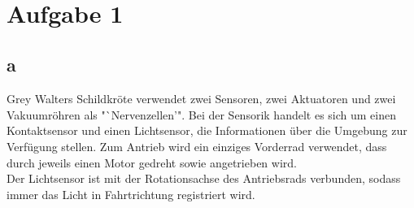 \documentclass{./Vorlage/mat}
\begin{document}
 \\

\section*{Aufgabe 1}
\subsection*{a}
Grey Walters Schildkröte verwendet zwei Sensoren, zwei Aktuatoren und zwei Vakuumröhren als "`Nervenzellen'". Bei der Sensorik handelt es sich um einen Kontaktsensor und einen Lichtsensor, die Informationen über die Umgebung zur Verfügung stellen. Zum Antrieb wird ein einziges Vorderrad verwendet, dass durch jeweils einen Motor gedreht sowie angetrieben wird.\\
Der Lichtsensor ist mit der Rotationsachse des Antriebsrads verbunden, sodass immer das Licht in Fahrtrichtung registriert wird.
\newpage
\end{document}
